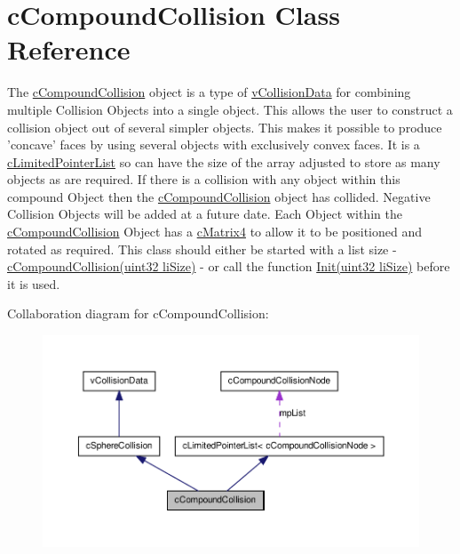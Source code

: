 \hypertarget{classc_compound_collision}{
\section{cCompoundCollision Class Reference}
\label{classc_compound_collision}
}


The \hyperlink{classc_compound_collision}{cCompoundCollision} object is a type of \hyperlink{classv_collision_data}{vCollisionData} for combining multiple Collision Objects into a single object. This allows the user to construct a collision object out of several simpler objects. This makes it possible to produce 'concave' faces by using several objects with exclusively convex faces. It is a \hyperlink{classc_limited_pointer_list}{cLimitedPointerList} so can have the size of the array adjusted to store as many objects as are required. If there is a collision with any object within this compound Object then the \hyperlink{classc_compound_collision}{cCompoundCollision} object has collided. Negative Collision Objects will be added at a future date. Each Object within the \hyperlink{classc_compound_collision}{cCompoundCollision} Object has a \hyperlink{classc_matrix4}{cMatrix4} to allow it to be positioned and rotated as required. This class should either be started with a list size -\/ \hyperlink{classc_compound_collision_a8769934e6b4193ad31663288f8f55d0a}{cCompoundCollision(uint32 liSize)} -\/ or call the function \hyperlink{classc_limited_pointer_list_ab72b03a5d82ee318bf21d3102bdfecda}{Init(uint32 liSize)} before it is used.  




Collaboration diagram for cCompoundCollision:
\nopagebreak
\begin{figure}[H]
\begin{center}
\leavevmode
\includegraphics[width=400pt]{classc_compound_collision__coll__graph}
\end{center}
\end{figure}
